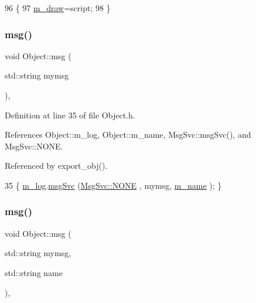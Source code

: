 \begin{DoxyCode}
96                              \{
97     \hyperlink{classPlot_a83ffbf3effe6a2f8befa6375882f3994}{m\_draw}=script;
98   \}
\end{DoxyCode}
\mbox{\label{classObject_a58b2d0618c2d08cf2383012611528d97}} 
\subsubsection{\texorpdfstring{msg()}{msg()}\hspace{0.1cm}{\footnotesize\ttfamily [1/2]}}
{\footnotesize\ttfamily void Object\+::msg (\begin{DoxyParamCaption}\item[{std\+::string}]{mymsg }\end{DoxyParamCaption})\hspace{0.3cm}{\ttfamily [inline]}, {\ttfamily [inherited]}}



Definition at line 35 of file Object.\+h.



References Object\+::m\+\_\+log, Object\+::m\+\_\+name, Msg\+Svc\+::msg\+Svc(), and Msg\+Svc\+::\+N\+O\+NE.



Referenced by export\+\_\+obj().


\begin{DoxyCode}
35 \{ \hyperlink{classObject_a0d269813dd7ac1f24bc143031e2963f2}{m\_log}.\hyperlink{classMsgSvc_ad25f18047920cc59a314e5098259711c}{msgSvc} (\hyperlink{classMsgSvc_ae671eb7301996cd049d2da8a65925926a9be9ae32fed8e1e6eba4a58692210fbd}{MsgSvc::NONE}    , mymsg, \hyperlink{classObject_a8b83c95c705d2c3ba0d081fe1710f48d}{m\_name} ); \}
\end{DoxyCode}
\mbox{\label{classObject_ac5d59299273cee27aacf7de00d2e7034}} 
\subsubsection{\texorpdfstring{msg()}{msg()}\hspace{0.1cm}{\footnotesize\ttfamily [2/2]}}
{\footnotesize\ttfamily void Object\+::msg (\begin{DoxyParamCaption}\item[{std\+::string}]{mymsg,  }\item[{std\+::string}]{name }\end{DoxyParamCaption})\hspace{0.3cm}{\ttfamily [inline]}, {\ttfamily [inherited]}}



